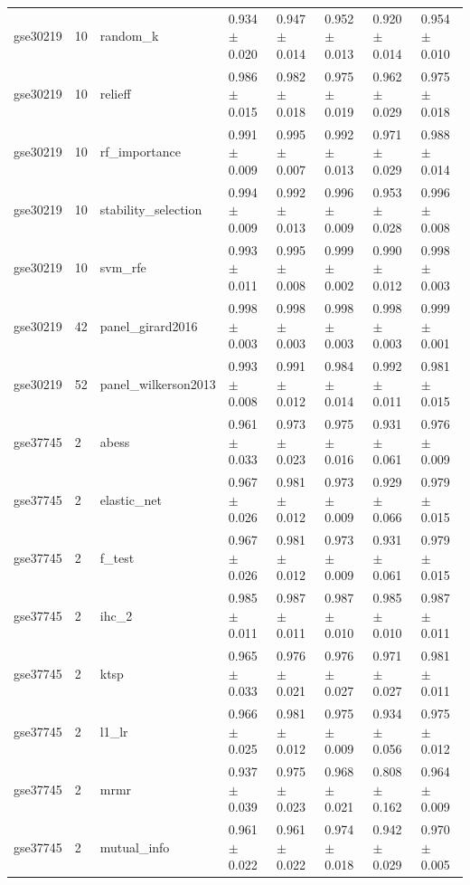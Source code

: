 \begin{table}[t]
\begin{tabular}{llllllll}
    gse30219 & 10 & random\_k & 0.934 $\pm$ 0.020 & 0.947 $\pm$ 0.014 & 0.952 $\pm$ 0.013 & 0.920 $\pm$ 0.014 & 0.954 $\pm$ 0.010 \\
    gse30219 & 10 & relieff & 0.986 $\pm$ 0.015 & 0.982 $\pm$ 0.018 & 0.975 $\pm$ 0.019 & 0.962 $\pm$ 0.029 & 0.975 $\pm$ 0.018 \\
    gse30219 & 10 & rf\_importance & 0.991 $\pm$ 0.009 & 0.995 $\pm$ 0.007 & 0.992 $\pm$ 0.013 & 0.971 $\pm$ 0.029 & 0.988 $\pm$ 0.014 \\
    gse30219 & 10 & stability\_selection & 0.994 $\pm$ 0.009 & 0.992 $\pm$ 0.013 & 0.996 $\pm$ 0.009 & 0.953 $\pm$ 0.028 & 0.996 $\pm$ 0.008 \\
    gse30219 & 10 & svm\_rfe & 0.993 $\pm$ 0.011 & 0.995 $\pm$ 0.008 & 0.999 $\pm$ 0.002 & 0.990 $\pm$ 0.012 & 0.998 $\pm$ 0.003 \\
    gse30219 & 42 & panel\_girard2016 & 0.998 $\pm$ 0.003 & 0.998 $\pm$ 0.003 & 0.998 $\pm$ 0.003 & 0.998 $\pm$ 0.003 & 0.999 $\pm$ 0.001 \\
    gse30219 & 52 & panel\_wilkerson2013 & 0.993 $\pm$ 0.008 & 0.991 $\pm$ 0.012 & 0.984 $\pm$ 0.014 & 0.992 $\pm$ 0.011 & 0.981 $\pm$ 0.015 \\
    gse37745 & 2 & abess & 0.961 $\pm$ 0.033 & 0.973 $\pm$ 0.023 & 0.975 $\pm$ 0.016 & 0.931 $\pm$ 0.061 & 0.976 $\pm$ 0.009 \\
    gse37745 & 2 & elastic\_net & 0.967 $\pm$ 0.026 & 0.981 $\pm$ 0.012 & 0.973 $\pm$ 0.009 & 0.929 $\pm$ 0.066 & 0.979 $\pm$ 0.015 \\
    gse37745 & 2 & f\_test & 0.967 $\pm$ 0.026 & 0.981 $\pm$ 0.012 & 0.973 $\pm$ 0.009 & 0.931 $\pm$ 0.061 & 0.979 $\pm$ 0.015 \\
    gse37745 & 2 & ihc\_2 & 0.985 $\pm$ 0.011 & 0.987 $\pm$ 0.011 & 0.987 $\pm$ 0.010 & 0.985 $\pm$ 0.010 & 0.987 $\pm$ 0.011 \\
    gse37745 & 2 & ktsp & 0.965 $\pm$ 0.033 & 0.976 $\pm$ 0.021 & 0.976 $\pm$ 0.027 & 0.971 $\pm$ 0.027 & 0.981 $\pm$ 0.011 \\
    gse37745 & 2 & l1\_lr & 0.966 $\pm$ 0.025 & 0.981 $\pm$ 0.012 & 0.975 $\pm$ 0.009 & 0.934 $\pm$ 0.056 & 0.975 $\pm$ 0.012 \\
    gse37745 & 2 & mrmr & 0.937 $\pm$ 0.039 & 0.975 $\pm$ 0.023 & 0.968 $\pm$ 0.021 & 0.808 $\pm$ 0.162 & 0.964 $\pm$ 0.009 \\
    gse37745 & 2 & mutual\_info & 0.961 $\pm$ 0.022 & 0.961 $\pm$ 0.022 & 0.974 $\pm$ 0.018 & 0.942 $\pm$ 0.029 & 0.970 $\pm$ 0.005 \\

\end{tabular}
\end{table}
